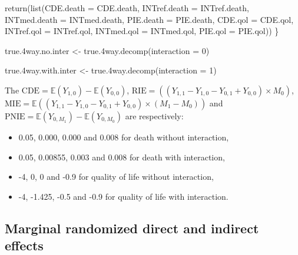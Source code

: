 \documentclass[
]{book}
\newenvironment{Shaded}{\begin{snugshade}}{\end{snugshade}}
\newcommand{\AttributeTok}[1]{\textcolor[rgb]{0.77,0.63,0.00}{#1}}
\newcommand{\DecValTok}[1]{\textcolor[rgb]{0.00,0.00,0.81}{#1}}
\newcommand{\FloatTok}[1]{\textcolor[rgb]{0.00,0.00,0.81}{#1}}
\newcommand{\FunctionTok}[1]{\textcolor[rgb]{0.00,0.00,0.00}{#1}}
\newcommand{\NormalTok}[1]{#1}
\newcommand{\OtherTok}[1]{\textcolor[rgb]{0.56,0.35,0.01}{#1}}
\providecommand{\tightlist}{%
  \setlength{\itemsep}{0pt}\setlength{\parskip}{0pt}}
\begin{document}
\begin{Shaded}
\begin{Highlighting}[]
  \FunctionTok{return}\NormalTok{(}\FunctionTok{list}\NormalTok{(}\AttributeTok{CDE.death =}\NormalTok{ CDE.death, }\AttributeTok{INTref.death =}\NormalTok{ INTref.death, }
              \AttributeTok{INTmed.death =}\NormalTok{ INTmed.death, }\AttributeTok{PIE.death =}\NormalTok{ PIE.death,}
              \AttributeTok{CDE.qol =}\NormalTok{ CDE.qol, }\AttributeTok{INTref.qol =}\NormalTok{ INTref.qol, }
              \AttributeTok{INTmed.qol =}\NormalTok{ INTmed.qol, }\AttributeTok{PIE.qol =}\NormalTok{ PIE.qol))}
\NormalTok{\}}
\end{Highlighting}
\end{Shaded}

\begin{Shaded}
\begin{Highlighting}[]
\NormalTok{true}\FloatTok{.4}\NormalTok{way.no.inter }\OtherTok{\textless{}{-}} \FunctionTok{true.4way.decomp}\NormalTok{(}\AttributeTok{interaction =} \DecValTok{0}\NormalTok{)}

\NormalTok{true}\FloatTok{.4}\NormalTok{way.with.inter }\OtherTok{\textless{}{-}} \FunctionTok{true.4way.decomp}\NormalTok{(}\AttributeTok{interaction =} \DecValTok{1}\NormalTok{)}
\end{Highlighting}
\end{Shaded}

The \(\text{CDE}=\mathbb{E}\left(Y_{1,0} \right) - \mathbb{E}\left(Y_{0,0}\right)\), \(\text{RIE}=\left((Y_{1,1} - Y_{1,0} - Y_{0,1} + Y_{0,0}) \times M_0\right)\), \(\text{MIE}= \mathbb{E}\left((Y_{1,1} - Y_{1,0} - Y_{0,1} + Y_{0,0}) \times (M_1 - M_0)\right)\) and \(\text{PNIE}=\mathbb{E}\left(Y_{0,M_1}\right) - \mathbb{E}\left(Y_{0,M_0}\right)\) are respectively:

\begin{itemize}
\tightlist
\item
  0.05, 0.000, 0.000 and 0.008 for death without interaction,
\item
  0.05, 0.00855, 0.003 and 0.008 for death with interaction,
\item
  -4, 0, 0 and -0.9 for quality of life without interaction,
\item
  -4, -1.425, -0.5 and -0.9 for quality of life with interaction.
\end{itemize}

\hypertarget{marginal-randomized-direct-and-indirect-effects}{%
\subsection{Marginal randomized direct and indirect effects}\label{marginal-randomized-direct-and-indirect-effects}}
\end{document}
